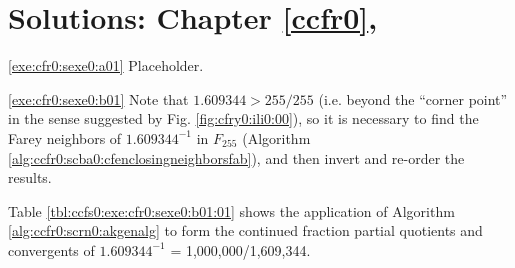 
\chapter[Solutions: \ccfrzeroxrefcomma{}Chapter \ref{ccfr0}]
        {Solutions: \ccfrzeroxrefcomma{}Chapter \ref{ccfr0}, \ccfrzerolongtitle{}}

\label{ccfs0}

\vworkexercisechapterheader{}
\begin{vworkexercisesolution}{\ref{exe:cfr0:sexe0:a01}}
Placeholder.

\end{vworkexercisesolution}
\vworkexerciseseparator
\begin{vworkexercisesolution}{\ref{exe:cfr0:sexe0:b01}}
Note that $1.609344 > 255/255$ (i.e. beyond the ``corner point''
in the sense suggested by Fig. \cfryzeroxrefhyphen{}\ref{fig:cfry0:ili0:00}), 
so it is necessary to find
the Farey neighbors of $1.609344^{-1}$ in $F_{255}$
(Algorithm \ccfrzeroxrefhyphen{}\ref{alg:ccfr0:scba0:cfenclosingneighborsfab}),
and then invert and re-order the results.

Table \ref{tbl:ccfs0:exe:cfr0:sexe0:b01:01} 
shows the application of 
Algorithm \ccfrzeroxrefhyphen{}\ref{alg:ccfr0:scrn0:akgenalg}
to form the continued fraction partial quotients and
convergents of $1.609344^{-1}$ = 1,000,000/1,609,344.


\end{vworkexercisesolution}
